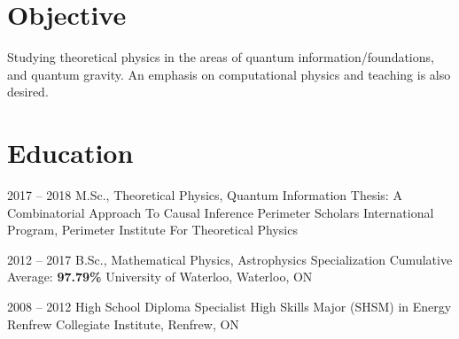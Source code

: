 \documentclass{article}
\begin{document}

    \section{Objective}
    Studying theoretical physics in the areas of quantum information/foundations, and quantum gravity. An emphasis on computational physics and teaching is also desired.
    \section{Education}
    \begin{educationlist}
        \item{2017 -- 2018}
            {M.Sc., Theoretical Physics, Quantum Information}
            {Thesis: A Combinatorial Approach To Causal Inference}
            {Perimeter Scholars International Program, Perimeter Institute For Theoretical Physics}
        \item{2012 -- 2017}
            {B.Sc., Mathematical Physics, Astrophysics Specialization}
            {Cumulative Average: \textbf{97.79\%}}
            {University of Waterloo, Waterloo, ON}
        \item{2008 -- 2012}
            {High School Diploma}
            {Specialist High Skills Major (SHSM) in Energy}
            {Renfrew Collegiate Institute, Renfrew, ON}
    \end{educationlist}
\end{document}
